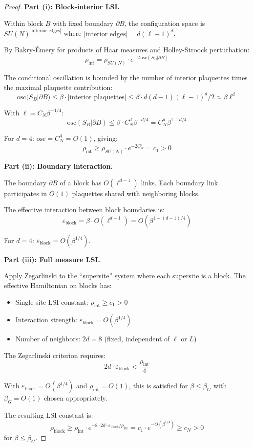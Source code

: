 \begin{proof}
\textbf{Part (i): Block-interior LSI.}

Within block $B$ with fixed boundary $\partial B$, the configuration space is 
$SU(N)^{|\text{interior edges}|}$ where $|\text{interior edges}| = d(\ell-1)^d$.

By Bakry-\'Emery for products of Haar measures and Holley-Stroock perturbation:
\[
\rho_{\text{int}} = \rho_{SU(N)} \cdot e^{-2\,\mathrm{osc}(S_B | \partial B)}
\]

The conditional oscillation is bounded by the number of interior plaquettes 
times the maximal plaquette contribution:
\[
\mathrm{osc}(S_B | \partial B) \leq \beta \cdot |\text{interior plaquettes}| 
\leq \beta \cdot d(d-1) (\ell-1)^d / 2 \approx \beta \ell^d
\]

With $\ell = C_N \beta^{-1/4}$:
\[
\mathrm{osc}(S_B | \partial B) \leq \beta \cdot C_N^d \beta^{-d/4} = C_N^d \beta^{1-d/4}
\]

For $d = 4$: $\mathrm{osc} = C_N^4 = O(1)$, giving:
\[
\rho_{\text{int}} \geq \rho_{SU(N)} \cdot e^{-2C_N^4} = c_1 > 0
\]

\textbf{Part (ii): Boundary interaction.}

The boundary $\partial B$ of a block has $O(\ell^{d-1})$ links. Each boundary 
link participates in $O(1)$ plaquettes shared with neighboring blocks.

The effective interaction between block boundaries is:
\[
\varepsilon_{\text{block}} = \beta \cdot O(\ell^{d-1}) = O(\beta^{1-(d-1)/4})
\]

For $d = 4$: $\varepsilon_{\text{block}} = O(\beta^{1/4})$.

\textbf{Part (iii): Full measure LSI.}

Apply Zegarlinski to the ``supersite'' system where each supersite is a block.
The effective Hamiltonian on blocks has:
\begin{itemize}
\item Single-site LSI constant: $\rho_{\text{int}} \geq c_1 > 0$
\item Interaction strength: $\varepsilon_{\text{block}} = O(\beta^{1/4})$
\item Number of neighbors: $2d = 8$ (fixed, independent of $\ell$ or $L$)
\end{itemize}

The Zegarlinski criterion requires:
\[
2d \cdot \varepsilon_{\text{block}} < \frac{\rho_{\text{int}}}{4}
\]

With $\varepsilon_{\text{block}} = O(\beta^{1/4})$ and $\rho_{\text{int}} = O(1)$, this is 
satisfied for $\beta \leq \beta_G$ with $\beta_G = O(1)$ chosen appropriately.

The resulting LSI constant is:
\[
\rho_{\text{block}} \geq \rho_{\text{int}} \cdot e^{-8 \cdot 2d \cdot \varepsilon_{\text{block}}/\rho_{\text{int}}}
= c_1 \cdot e^{-O(\beta^{1/4})} \geq c_N > 0
\]
for $\beta \leq \beta_G$.
\end{proof}

